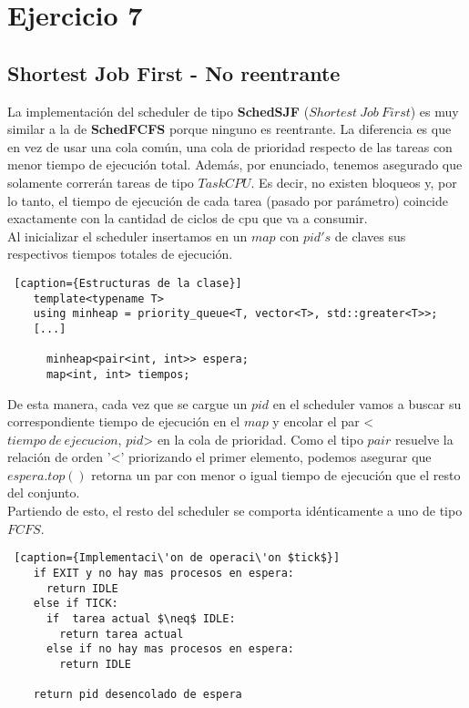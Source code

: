 \section{Ejercicio 7}

\subsection{Shortest Job First - No reentrante}

  La implementación del scheduler de tipo \textbf{SchedSJF} ($Shortest\ Job\ First$) es muy similar a la de \textbf{SchedFCFS} porque ninguno es reentrante. La diferencia es que en vez de usar una cola común, una cola de prioridad respecto de las tareas con menor tiempo de ejecución total.
  Además, por enunciado, tenemos asegurado que solamente correrán tareas de tipo $TaskCPU$. Es decir, no existen bloqueos y, por lo tanto, el tiempo de ejecución de cada tarea (pasado por parámetro) coincide exactamente con la cantidad de ciclos de cpu que va a consumir.
  \\

  Al inicializar el scheduler insertamos en un $map$ con $pid's$ de claves sus respectivos tiempos totales de ejecución.

  \begin{lstlisting} [caption={Estructuras de la clase}]
    template<typename T>
    using minheap = priority_queue<T, vector<T>, std::greater<T>>;
    [...]

      minheap<pair<int, int>> espera;
      map<int, int> tiempos;
  \end{lstlisting}


  De esta manera, cada vez que se cargue un $pid$ en el scheduler vamos a buscar su correspondiente tiempo de ejecución en el $map$ y encolar el par <$tiempo \ de \ ejecucion$, $pid$> en la cola de prioridad. Como el tipo $pair$ resuelve la relación de orden '<' priorizando el primer elemento, podemos asegurar que $espera.top()$ retorna un par con menor o igual tiempo de ejecución que el resto del conjunto.
  \\

  Partiendo de esto, el resto del scheduler se comporta idénticamente a uno de tipo $FCFS$.

  \begin{lstlisting} [caption={Implementaci\'on de operaci\'on $tick$}]
    if EXIT y no hay mas procesos en espera:
      return IDLE
    else if TICK:
      if  tarea actual $\neq$ IDLE:
        return tarea actual
      else if no hay mas procesos en espera:
        return IDLE

    return pid desencolado de espera
  \end{lstlisting}


